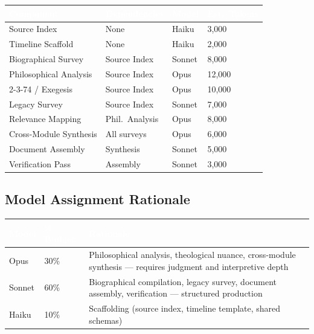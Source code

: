 \documentclass[11pt,letterpaper]{article}
\newcommand{\tableheader}[1]{\textbf{\sffamily\textcolor{white}{#1}}}
\begin{document}
\begin{center}
\begin{tabularx}{\textwidth}{L{3.5cm}L{2cm}C{1.5cm}C{2cm}}
\toprule
{}
\tableheader{Component} & \tableheader{Dependencies} & \tableheader{Model} & \tableheader{Est.\ Tokens} \\
\midrule
Source Index & None & Haiku & 3,000 \\
Timeline Scaffold & None & Haiku & 2,000 \\
Biographical Survey & Source Index & Sonnet & 8,000 \\
Philosophical Analysis & Source Index & Opus & 12,000 \\
2-3-74 / Exegesis & Source Index & Opus & 10,000 \\
Legacy Survey & Source Index & Sonnet & 7,000 \\
Relevance Mapping & Phil.\ Analysis & Opus & 8,000 \\
Cross-Module Synthesis & All surveys & Opus & 6,000 \\
Document Assembly & Synthesis & Sonnet & 5,000 \\
Verification Pass & Assembly & Sonnet & 3,000 \\
\bottomrule
\end{tabularx}
\end{center}

\subsection{Model Assignment Rationale}

\begin{center}
\begin{tabularx}{\textwidth}{C{1.5cm}C{1.5cm}X}
\toprule
{}
\tableheader{Model} & \tableheader{\% Budget} & \tableheader{Rationale} \\
\midrule
Opus & 30\% & Philosophical analysis, theological nuance, cross-module synthesis --- requires judgment and interpretive depth \\
Sonnet & 60\% & Biographical compilation, legacy survey, document assembly, verification --- structured production \\
Haiku & 10\% & Scaffolding (source index, timeline template, shared schemas) \\
\bottomrule
\end{tabularx}
\end{center}
\end{document}
